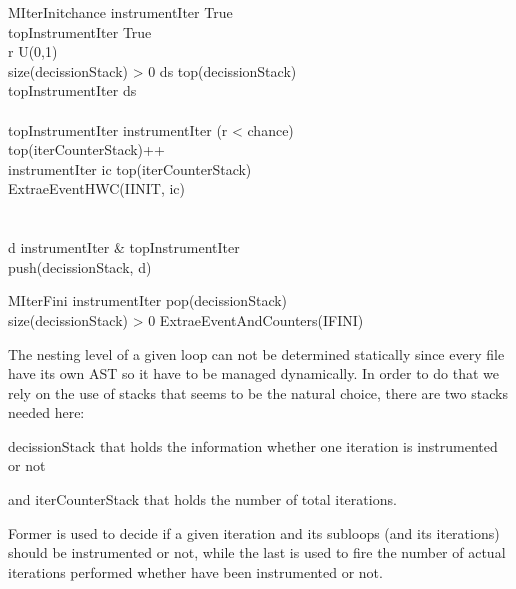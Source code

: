 \begin{multicols}{2}
  \begin{pseudocode}{MIterInit}{chance}
  \label{pc:mercurium_monitor_iter_init}
      instrumentIter \GETS True\\
      topInstrumentIter \GETS True\\
      r \in U(0,1)\\
      \IF size(decissionStack) > 0 \THEN
      \BEGIN
        ds \GETS top(decissionStack)\\
        topInstrumentIter \GETS ds\\
      \END\\
      \IF topInstrumentIter \THEN
      \BEGIN
          instrumentIter \GETS (r < chance)\\
          top(iterCounterStack)++\\
          \IF instrumentIter \THEN
          \BEGIN
              ic \GETS top(iterCounterStack)\\
              ExtraeEventHWC(IINIT, ic)\\
          \END\\
      \END\\
      d \GETS instrumentIter \&  topInstrumentIter\\
      push(decissionStack, d)\\
  \end{pseudocode}

  \begin{pseudocode}{MIterFini}{ }
  \label{pc:mercurium_monitor_iter_fini}
      instrumentIter \GETS pop(decissionStack)\\
      \IF size(decissionStack) > 0 \THEN
      \BEGIN
        ExtraeEventAndCounters(IFINI)
      \END\\
  \end{pseudocode}
\end{multicols}

The nesting level
of a given loop can not be determined statically since every file have its own
AST so it have to be managed dynamically. In order to do that we rely on the use
of stacks that seems to be the natural choice, there are two stacks needed
here:
\begin{enumerate*}[label=\roman*)]
  \item decissionStack that holds the information whether one iteration is
    instrumented or not
  \item and iterCounterStack that holds the number of total iterations.
\end{enumerate*}
Former is used to decide if a given iteration and its subloops (and its 
iterations) should be instrumented or not, while the last is used to fire the
number of actual iterations performed whether have been instrumented or not.

